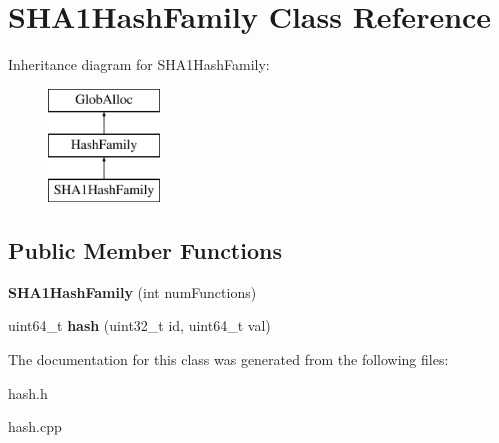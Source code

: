 \hypertarget{classSHA1HashFamily}{\section{S\-H\-A1\-Hash\-Family Class Reference}
\label{classSHA1HashFamily}
}
Inheritance diagram for S\-H\-A1\-Hash\-Family\-:\begin{figure}[H]
\begin{center}
\leavevmode
\includegraphics[height=3.000000cm]{classSHA1HashFamily}
\end{center}
\end{figure}
\subsection*{Public Member Functions}
\begin{DoxyCompactItemize}
\item 
\hypertarget{classSHA1HashFamily_ad259b15e686a9156e67d32aee169f4a7}{{\bfseries S\-H\-A1\-Hash\-Family} (int num\-Functions)}\label{classSHA1HashFamily_ad259b15e686a9156e67d32aee169f4a7}

\item 
\hypertarget{classSHA1HashFamily_abc713a520d1f69cef6f50f51b962c652}{uint64\-\_\-t {\bfseries hash} (uint32\-\_\-t id, uint64\-\_\-t val)}\label{classSHA1HashFamily_abc713a520d1f69cef6f50f51b962c652}

\end{DoxyCompactItemize}


The documentation for this class was generated from the following files\-:\begin{DoxyCompactItemize}
\item 
hash.\-h\item 
hash.\-cpp\end{DoxyCompactItemize}
